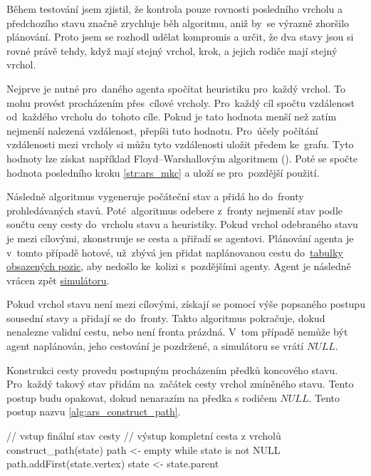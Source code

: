 Během testování jsem zjistil, že kontrola pouze rovnosti posledního vrcholu a předchozího stavu
značně zrychluje běh algoritmu, aniž by~se výrazně zhoršilo plánování.
Proto jsem se rozhodl udělat kompromis a určit, že dva stavy jsou si rovné právě tehdy,
když mají stejný vrchol, krok, a jejich rodiče mají stejný vrchol.

Nejprve je nutné pro~daného agenta spočítat heuristiku pro~každý vrchol.
To mohu provést procházením přes~cílové vrcholy.
Pro~každý cíl spočtu vzdálenost od~každého vrcholu do~tohoto cíle.
Pokud je tato hodnota menší než zatím nejmenší nalezená vzdálenost, přepíši tuto hodnotu.
Pro~účely počítání vzdálenosti mezi vrcholy si můžu tyto vzdálenosti uložit předem ke~grafu.
Tyto hodnoty lze získat například Floyd–Warshallovým algoritmem (\citet*{Floyd-Warshall}).
Poté se spočte hodnota posledního kroku \ref{str:ars_mkc} a uloží se pro~pozdější použití.

Následně algoritmus vygeneruje počáteční stav a přidá ho do~fronty prohledávaných stavů.
Poté~algoritmus odebere z~fronty nejmenší stav podle součtu ceny cesty do~vrcholu stavu a heuristiky.
Pokud vrchol odebraného stavu je mezi cílovými, zkonstruuje se cesta a přiřadí se agentovi.
Plánování agenta je v~tomto případě hotové, už~zbývá jen přidat naplánovanou cestu
do~\hyperref[par:obsazene_pozice]{tabulky obsazených pozic}, aby nedošlo ke~kolizi s~pozdějšími agenty.
Agent je následně vrácen zpět \hyperref[sec:simulace]{simulátoru}.

Pokud vrchol stavu není mezi cílovými,
získají se pomocí výše popsaného postupu sousední stavy a přidají se do~fronty.
Takto algoritmus pokračuje, dokud nenalezne validní cestu, nebo není fronta prázdná.
V~tom případě nemůže být agent naplánován, jeho cestování je pozdržené, a simulátoru se vrátí $NULL$.

Konstrukci cesty provedu postupným procházením předků koncového stavu.
Pro~každý takový stav přidám na~začátek cesty vrchol zmíněného stavu.
Tento postup budu opakovat, dokud nenarazím na předka s rodičem $NULL$.
Tento postup nazvu \ref{alg:ars_construct_path}.

\begin{code}[fontsize=\footnotesize]
// vstup finální stav cesty
// výstup kompletní cesta z vrcholů
construct_path(state)
  path <- empty
  while state is not NULL
    path.addFirst(state.vertex)
    state <- state.parent
\end{code}


